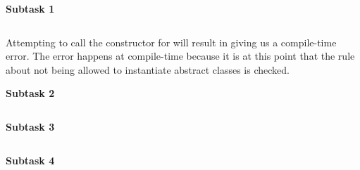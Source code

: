 \textbf{Subtask 1}

\inputminted{csharp}{\context/answer/Item.cs}

Attempting to call the constructor for  will result in \csharp giving us a compile-time error. The error happens at compile-time because it is at this point that the rule about not being allowed to instantiate abstract classes is checked.

\textbf{Subtask 2}

\inputminted{csharp}{\context/answer/IExpirable.cs}

\textbf{Subtask 3}

\inputminted{csharp}{\context/answer/exercise3/Item.cs}

\textbf{Subtask 4}

\inputminted{csharp}{\context/answer/exercise3/FoodItem.cs}



